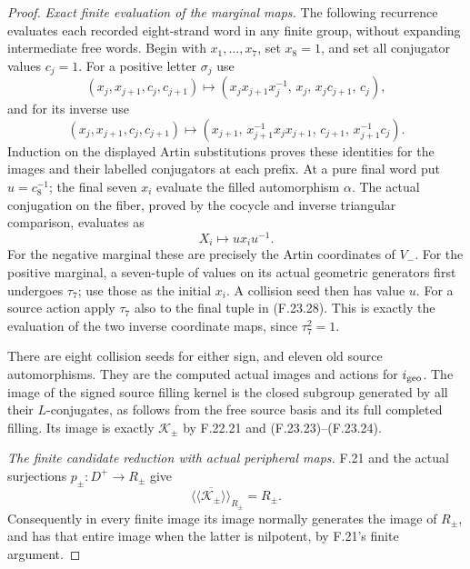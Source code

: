\begin{proof}
\emph{Exact finite evaluation of the marginal maps.}
The following recurrence evaluates each recorded eight-strand
word in any finite group, without expanding intermediate free
words. Begin with $x_1,\ldots,x_7$, set $x_8=1$, and set all
conjugator values $c_j=1$. For a positive letter $\sigma_j$ use
\[
 (x_j,x_{j+1},c_j,c_{j+1})
  \longmapsto
 (x_jx_{j+1}x_j^{-1},\,x_j,\,x_jc_{j+1},\,c_j),                 \tag{F.23.26}
\]
and for its inverse use
\[
 (x_j,x_{j+1},c_j,c_{j+1})
  \longmapsto
 (x_{j+1},\,x_{j+1}^{-1}x_jx_{j+1},\,c_{j+1},
                                      \,x_{j+1}^{-1}c_j).     \tag{F.23.27}
\]
Induction on the displayed Artin substitutions proves these
identities for the images and their labelled conjugators at
each prefix. At a pure final word put $u=c_8^{-1}$; the final
seven $x_i$ evaluate the filled automorphism $\alpha$.
The actual conjugation on the fiber, proved by the cocycle
and inverse triangular comparison, evaluates as
\[
                         X_i\longmapsto u x_i u^{-1}.          \tag{F.23.28}
\]
For the negative marginal these are precisely the Artin
coordinates of $V_-$. For the positive marginal, a seven-tuple
of values on its actual geometric generators first undergoes
$\tau_7$; use those as the initial $x_i$. A collision seed then
has value $u$. For a source action apply $\tau_7$ also to the
final tuple in (F.23.28). This is exactly the evaluation of
the two inverse coordinate maps, since $\tau_7^2=1$.

There are eight collision seeds for either sign, and eleven
old source automorphisms. They are the computed actual
images and actions for $i_{\rm geo}$. The image of the signed
source filling kernel is the closed subgroup generated by
all their $L$-conjugates, as follows from the free source basis
and its full completed filling. Its image is exactly
$\mathcal K_\pm$ by F.22.21 and (F.23.23)--(F.23.24).

\emph{The finite candidate reduction with actual peripheral maps.}
F.21 and the actual surjections $p_\pm:D^+\to R_\pm$ give
\[
        \overline{\langle\!\langle\mathcal K_\pm
                    \rangle\!\rangle}_{R_\pm}=R_\pm.          \tag{F.23.29}
\]
Consequently in every finite image its image normally
generates the image of $R_\pm$, and has that entire image
when the latter is nilpotent, by F.21's finite argument.


\end{proof}
